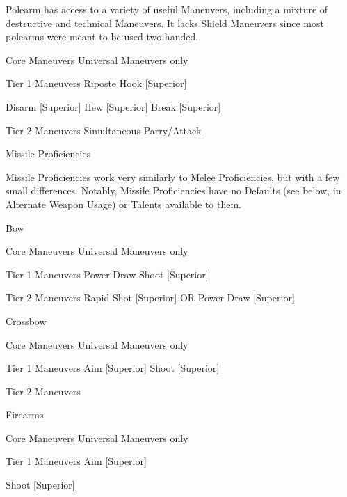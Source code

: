 \documentclass[oneside,11pt,english]{book}
\begin{document}
 

Polearm has access to a variety of useful Maneuvers, including a mixture of destructive and technical 
Maneuvers. It lacks Shield Maneuvers since most polearms were meant to be used two-handed. 

 

Core Maneuvers 
Universal Maneuvers only 

 

Tier 1 Maneuvers 
Riposte 
Hook [Superior] 


Disarm [Superior] 
Hew [Superior] 
Break [Superior] 

 

Tier 2 Maneuvers 
Simultaneous Parry/Attack 

 

Missile Proficiencies 

 

Missile Proficiencies work very similarly to Melee Proficiencies, but with a few small differences. 
Notably, Missile Proficiencies have no Defaults (see below, in Alternate Weapon Usage) or Talents 
available to them. 

 

Bow 

 

Core Maneuvers 
Universal Maneuvers only 

 

Tier 1 Maneuvers 
Power Draw 
Shoot [Superior] 

 

Tier 2 Maneuvers 
Rapid Shot [Superior] OR Power Draw [Superior] 

 

 

Crossbow 

 

Core Maneuvers 
Universal Maneuvers only 

 

Tier 1 Maneuvers 
Aim [Superior] 
Shoot [Superior] 

 

Tier 2 Maneuvers 

 

Firearms 

 

Core Maneuvers 
Universal Maneuvers only 

 

Tier 1 Maneuvers 
Aim [Superior] 


Shoot [Superior] 

 
\end{document}

